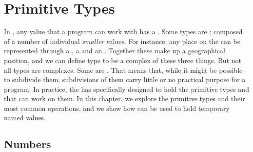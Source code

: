 \chapter{Primitive Types}

In \csharp, any value that a program can work with has a . Some types are ; composed of a number of individual \textsl{smaller} values. For instance, any place on the  can be represented through a , a  and an . Together these make up a geographical position, and we can define type to be a complex of these three things. But not all types are complexes. Some are . That means that, while it might be possible to subdivide them, subdivisions of them carry little or no practical purpose for a program. In practice, the  has  specifically designed to hold the primitive types and  that can work on them. In this chapter, we explore the primitive types and their most common operations, and we show how  can be used to hold temporary named values.

\section{Numbers}
\label{sec:primitive:numbers}

